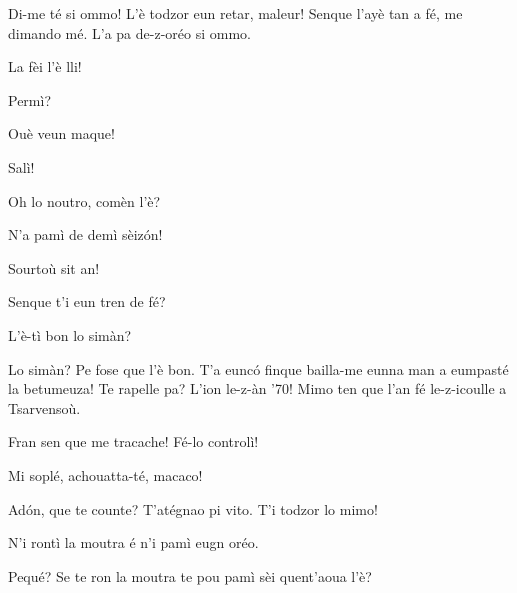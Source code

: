 
\DramPer

\act[Acte I]

\ridoiver




\begin{drama}

\Vioupspeaks{} Di-me té si ommo! L'è todzor eun retar, maleur! Senque l'ayè tan a fé, me dimando mé. L'a pa de-z-oréo si ommo.

			
\Vioupspeaks La fèi l'è lli!			
			
\Vioujspeaks {} Permì?

\Vioupspeaks Ouè veun maque!

\Vioujspeaks Salì!


\Vioupspeaks Oh lo noutro, comèn l'è?

\Vioujspeaks N'a pamì de demì sèiz\'on!

\Vioupspeaks Sourtoù sit an!


\Vioupspeaks Senque t'i eun tren de fé?

\Vioujspeaks L’è-tì bon lo simàn?

\Vioupspeaks Lo simàn? Pe fose que l'è bon. T'a eunc\'o finque bailla-me eunna man a eumpasté la betumeuza! Te rapelle pa? L'ion le-z-àn '70! Mimo ten que l'an fé le-z-icoulle a Tsarvensoù.

\Vioujspeaks Fran sen que me tracache! Fé-lo controlì! 

\Vioupspeaks Mi soplé, achouatta-té, macaco!


\Vioupspeaks Ad\'on, que te counte? T'atégnao pi vito. T'i todzor lo mimo!

\Vioujspeaks N'i rontì la moutra é n'i pamì eugn oréo.

\Vioupspeaks Pequé? Se te ron la moutra te pou pamì sèi quent'aoua l'è?


\end{drama}
